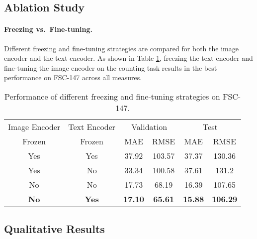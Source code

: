 \documentclass{bmvc2k}
\begin{document}
\subsection{Ablation Study}








\paragraph{Freezing vs.\ Fine-tuning.}\label{finetune_or_freeze}
Different freezing and fine-tuning strategies are compared for both the image encoder and the text encoder. As shown in Table \ref{freeze_or_finetune}, freezing the text encoder and fine-tuning the image encoder on the counting task results in the best performance on FSC-147 across all measures.

\begin{table}[h!]
\begin{center}
\scriptsize
\begin{tabular}{|c|c|c|c|c|c|} 
 \hline
 Image Encoder & Text Encoder & \multicolumn{2}{c|}{Validation} & \multicolumn{2}{c|}{Test} \\
  Frozen &  Frozen & MAE & RMSE & MAE & RMSE \\
  \hline
  Yes & Yes & 37.92 & 103.57 & 37.37 & 130.36\\
  Yes & No & 33.34 & 100.58 & 37.61 & 131.2\\
  No & No & 17.73 & 68.19 & 16.39 & 107.65\\
  \textbf{No} & \textbf{Yes} & \textbf{17.10} & \textbf{65.61} & \textbf{15.88} & \textbf{106.29}\\
 \hline
\end{tabular}
\caption{\label{freeze_or_finetune} Performance of different freezing and fine-tuning strategies on FSC-147.}
\end{center}
\end{table}

\subsection{Qualitative Results}
\end{document}
